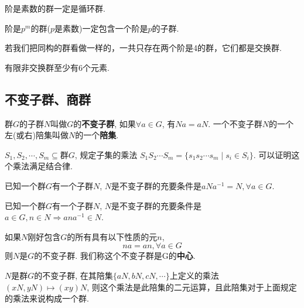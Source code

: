 \begin{Proposition}
阶是素数的群一定是循环群.
\end{Proposition}

\begin{Proposition}
阶是$p^m$的群($p$是素数)一定包含一个阶是$p$的子群.
\end{Proposition}

\begin{Proposition}
若我们把同构的群看做一样的，一共只存在两个阶是4的群，它们都是交换群.
\end{Proposition}

\begin{Proposition}
有限非交换群至少有6个元素.
\end{Proposition}

\subsection{不变子群、商群}

\begin{Definition}[不变子群]
群$G$的子群$N$叫做$G$的\textbf{不变子群}, 如果$\forall a \in G$, 有$Na = aN$. 一个不变子群$N$的一个左(或右)陪集叫做$N$的一个\textbf{陪集}.
\end{Definition}

\begin{Definition}
$S_1, S_2, \cdots, S_m \subseteq $群$G$, 规定子集的乘法
$S_1 S_2 \cdots S_m = \{s_1 s_2 \cdots s_m \mid s_i \in S_i \}$. 可以证明这个乘法满足结合律.
\end{Definition}

\begin{Theorem}
已知一个群$G$有一个子群$N$, $N$是不变子群的充要条件是$aNa^{-1} = N, \forall a \in G$.
\end{Theorem}

\begin{Theorem}
已知一个群$G$有一个子群$N$, $N$是不变子群的充要条件是
$a \in G, n \in N \Rightarrow ana^{-1} \in N $.
\end{Theorem}

\begin{Theorem}
如果$N$刚好包含$G$的所有具有以下性质的元$n$,
$$
	na = an, \forall a \in G
$$
则$N$是$G$的不变子群. 我们称这个不变子群是G的\textbf{中心}.
\end{Theorem}

\begin{Theorem}
$N$是群$G$的不变子群, 在其陪集$\{ aN, bN, cN, \cdots \}$上定义的乘法$(xN, yN) \mapsto (xy)N$, 则这个乘法是此陪集的二元运算，且此陪集对于上面规定的乘法来说构成一个群.
\end{Theorem}

